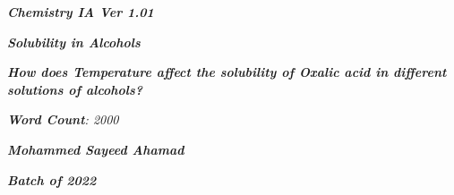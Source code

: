 

\begin{titlepage}
    \begin{center}
        \vspace*{1cm}
            
        \date{}
            
        \huge
            
        \textit{\textbf{Chemistry IA Ver 1.01}}
            
        \vspace{0.25cm}
            
        \hline
            
        \vspace{2.5cm}
            
        \textit{\textbf{Solubility in Alcohols}}
            
        \vspace{1cm}
            
        \LARGE
            
        \textit{\textbf{How does Temperature affect the solubility of Oxalic acid in different solutions of alcohols? }}
            
        \vspace{2.5cm}
            
        \Large
            
		\textit{\textbf{Word Count}: 2000}            

		\vspace{1cm}            
            
		\Large		
		            
        \textit{\textbf{Mohammed Sayeed Ahamad}}
            
        \vspace{2cm}
            
        \Large
            
        \textit{\textbf{Batch of 2022}}
            
        \vspace{0.25cm}
            
        \hline
           
            
    \end{center}
\end{titlepage}





